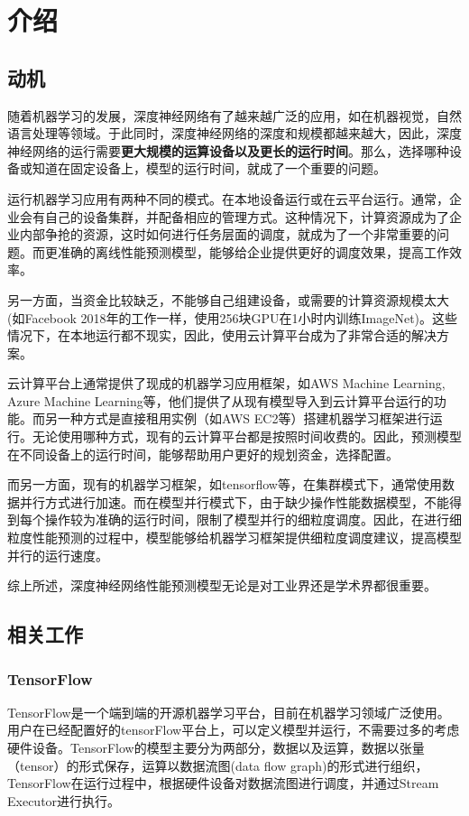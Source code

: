 \chapter{介绍}
\label{cha:intro}

\section{动机}
\label{sec:motivation}
    随着机器学习的发展，深度神经网络有了越来越广泛的应用，如在机器视觉，自然语言处理等领域。于此同时，深度神经网络的深度和规模都越来越大，因此，深度神经网络的运行需要{\bfseries 更大规模的运算设备以及更长的运行时间}。那么，选择哪种设备或知道在固定设备上，模型的运行时间，就成了一个重要的问题。

    运行机器学习应用有两种不同的模式。在本地设备运行或在云平台运行。通常，企业会有自己的设备集群，并配备相应的管理方式。这种情况下，计算资源成为了企业内部争抢的资源，这时如何进行任务层面的调度，就成为了一个非常重要的问题。而更准确的离线性能预测模型，能够给企业提供更好的调度效果，提高工作效率。
    
    另一方面，当资金比较缺乏，不能够自己组建设备，或需要的计算资源规模太大(如Facebook 2018年的工作一样，使用256块GPU在1小时内训练ImageNet)。这些情况下，在本地运行都不现实，因此，使用云计算平台成为了非常合适的解决方案。
    
    云计算平台上通常提供了现成的机器学习应用框架，如AWS Machine Learning, Azure Machine Learning等，他们提供了从现有模型导入到云计算平台运行的功能。而另一种方式是直接租用实例（如AWS EC2等）搭建机器学习框架进行运行。无论使用哪种方式，现有的云计算平台都是按照时间收费的。因此，预测模型在不同设备上的运行时间，能够帮助用户更好的规划资金，选择配置。
    
    而另一方面，现有的机器学习框架，如tensorflow等，在集群模式下，通常使用数据并行方式进行加速。而在模型并行模式下，由于缺少操作性能数据模型，不能得到每个操作较为准确的运行时间，限制了模型并行的细粒度调度。因此，在进行细粒度性能预测的过程中，模型能够给机器学习框架提供细粒度调度建议，提高模型并行的运行速度。
    
    综上所述，深度神经网络性能预测模型无论是对工业界还是学术界都很重要。

\section{相关工作}
\label{sec:related}

\subsection{TensorFlow}
    TensorFlow是一个端到端的开源机器学习平台，目前在机器学习领域广泛使用。用户在已经配置好的tensorFlow平台上，可以定义模型并运行，不需要过多的考虑硬件设备。TensorFlow的模型主要分为两部分，数据以及运算，数据以张量（tensor）的形式保存，运算以数据流图(data flow graph)的形式进行组织，TensorFlow在运行过程中，根据硬件设备对数据流图进行调度，并通过Stream Executor进行执行。

